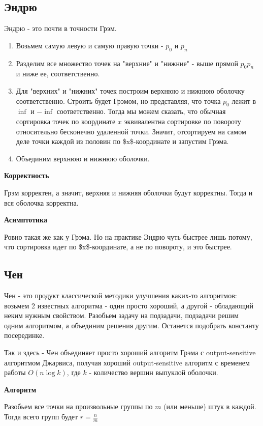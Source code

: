 \documentclass[11pt]{article}
\begin{document}
\subsection{{\bfseries{}} Эндрю}
\label{sec:orgheadline24}
Эндрю - это почти в точности Грэм.
\begin{enumerate}
\item Возьмем самую левую и самую правую точки - \(p_0\) и \(p_n\)
\item Разделим все множество точек на "верхние" и "нижние" - выше прямой \(p_0 p_n\) и ниже ее, соответственно.
\item Для "верхних" и "нижних" точек построим верхнюю и нижнюю оболочку соответственно.
Строить будет Грэмом, но представляя, что точка \(p_0\) лежит в \(\inf\) и \(-\inf\) соответственно.
Тогда мы можем сказать, что обычная сортировка точек по координате \(x\) эквивалентна сортировке по
повороту относительно бесконечно удаленной точки. Значит, отсортируем на самом деле точки каждой
из половин по \$x\$-координате и запустим Грэма.
\item Объединим верхнюю и нижнюю оболочки.
\end{enumerate}

\textbf{Корректность}

Грэм корректен, а значит, верхняя и нижняя оболочки будут корректны. Тогда и вся оболочка корректна.

\textbf{Асимптотика}

Ровно такая же как у Грэма. Но на практике Эндрю чуть быстрее лишь потому, что сортировка идет
по \$x\$-координате, а не по повороту, и это быстрее.
\subsection{{\bfseries{}} Чен}
\label{sec:orgheadline25}
Чен - это продукт классической методики улучшения каких-то алгоритмов:
возьмем 2 известных алгоритма - один просто хороший, а другой - обладающий
неким нужным свойством. Разобьем задачу на подзадачи, подзадачи решим одним
алгоритмом, а объединим решения другим. Останется подобрать константу посерединке.

Так и здесь - Чен объединяет просто хороший алгоритм Грэма с output-sensitive
алгоритмом Джарвиса, получая хороший output-sensitive алгоритм с временем работы \(O(n \log k)\),
где \(k\) - количество вершин выпуклой оболочки.

\textbf{Алгоритм}

Разобьем все точки на произвольные группы по \(m\) (или меньше) штук в каждой.
Тогда всего групп будет \(r = \frac{n}{m}\)
\end{document}
